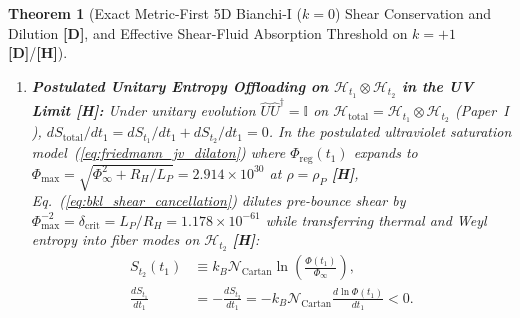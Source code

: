 \documentclass[11pt,a4paper]{article}
\newcommand{\catD}{\textbf{\textcolor{blue!75!black}{[D]}}}
\newcommand{\catH}{\textbf{\textcolor{orange!85!black}{[H]}}}
\theoremstyle{plain}
\newtheorem{theorem}{Theorem}[section]
\theoremstyle{definition}
\theoremstyle{remark}
\numberwithin{equation}{section}
\begin{document}
\begin{theorem}[Exact Metric-First 5D Bianchi-I ($k = 0$) Shear Conservation and Dilution \catD, and Effective Shear-Fluid Absorption Threshold on $k = +1$ \catD/\catH]
\begin{enumerate}
    \item[\textnormal{(iii)}] \textbf{Postulated Unitary Entropy Offloading on $\mathcal{H}_{t_1} \otimes \mathcal{H}_{t_2}$ in the UV Limit \catH:} Under unitary evolution $\hat{U}\hat{U}^\dagger = \mathbb{I}$ on $\mathcal{H}_{\text{total}} = \mathcal{H}_{t_1} \otimes \mathcal{H}_{t_2}$ (\textit{Paper~I} \cite{jimenez2026a}), $d S_{\text{total}} / dt_1 = d S_{t_1}/dt_1 + d S_{t_2}/dt_1 = 0$. In the postulated ultraviolet saturation model~(\ref{eq:friedmann_jv_dilaton}) where $\Phi_{\text{reg}}(t_1)$ expands to $\Phi_{\max} = \sqrt{\Phi_{\infty}^2 + R_H/L_P} = 2.914 \times 10^{30}$ at $\rho = \rho_P$ \catH, Eq.~(\ref{eq:bkl_shear_cancellation}) dilutes pre-bounce shear by $\Phi_{\max}^{-2} = \delta_{\text{crit}} = L_P/R_H = 1.178 \times 10^{-61}$ while transferring thermal and Weyl entropy into fiber modes on $\mathcal{H}_{t_2}$ \catH:
    \begin{align}
    S_{t_2}(t_1) &\equiv k_B \mathcal{N}_{\text{Cartan}} \ln\!\left(\frac{\Phi(t_1)}{\Phi_{\infty}}\right), \nonumber \\[3pt]
    \frac{d S_{t_1}}{dt_1} &= -\frac{d S_{t_2}}{dt_1} = -k_B \mathcal{N}_{\text{Cartan}} \frac{d\ln\Phi(t_1)}{dt_1} < 0.
    \label{eq:entropy_offloading_law}
    \end{align}
\end{enumerate}
\end{theorem}
\end{document}
